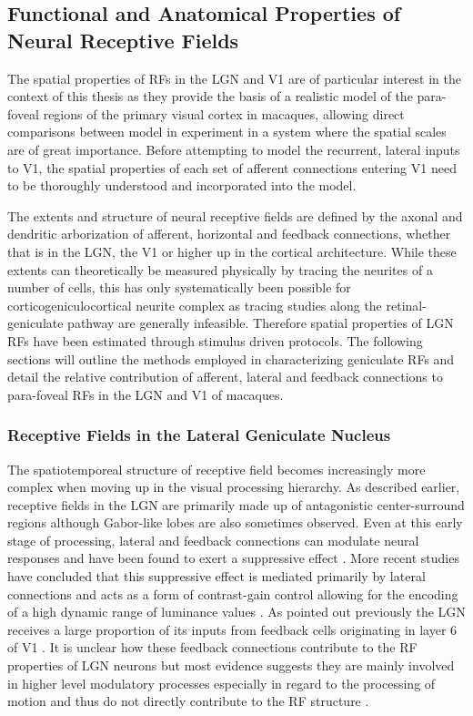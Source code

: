\subsection{Functional and Anatomical Properties of Neural Receptive Fields}

The spatial properties of RFs in the LGN and V1 are of particular
interest in the context of this thesis as they provide the basis of a
realistic model of the para-foveal regions of the primary visual
cortex in macaques, allowing direct comparisons between model in
experiment in a system where the spatial scales are of great
importance. Before attempting to model the recurrent, lateral inputs
to V1, the spatial properties of each set of afferent connections
entering V1 need to be thoroughly understood and incorporated into the
model.

The extents and structure of neural receptive fields are defined by
the axonal and dendritic arborization of afferent, horizontal and
feedback connections, whether that is in the LGN, the V1 or higher up
in the cortical architecture. While these extents can theoretically be
measured physically by tracing the neurites of a number of cells, this
has only systematically been possible for corticogeniculocortical
neurite complex as tracing studies along the retinal-geniculate
pathway are generally infeasible. Therefore spatial properties of LGN
RFs have been estimated through stimulus driven protocols. The
following sections will outline the methods employed in characterizing
geniculate RFs and detail the relative contribution of afferent,
lateral and feedback connections to para-foveal RFs in the LGN and V1
of macaques.

\subsubsection{Receptive Fields in the Lateral Geniculate Nucleus}
\label{sec:LGNRF}

The spatiotemporeal structure of receptive field becomes increasingly
more complex when moving up in the visual processing hierarchy. As
described earlier, receptive fields in the LGN are primarily made up
of antagonistic center-surround regions although Gabor-like lobes are
also sometimes observed. Even at this early stage of processing,
lateral and feedback connections can modulate neural responses and
have been found to exert a suppressive effect \citep{Hubel1961}. More
recent studies have concluded that this suppressive effect is mediated
primarily by lateral connections and acts as a form of contrast-gain
control allowing for the encoding of a high dynamic range of luminance
values \cite{Bonin2005}. As pointed out previously the LGN receives a
large proportion of its inputs from feedback cells originating in
layer 6 of V1 \citep{Sherman2002}. It is unclear how these feedback
connections contribute to the RF properties of LGN neurons but most
evidence suggests they are mainly involved in higher level modulatory
processes especially in regard to the processing of motion and thus do
not directly contribute to the RF structure \citep{Sillito2006}.

